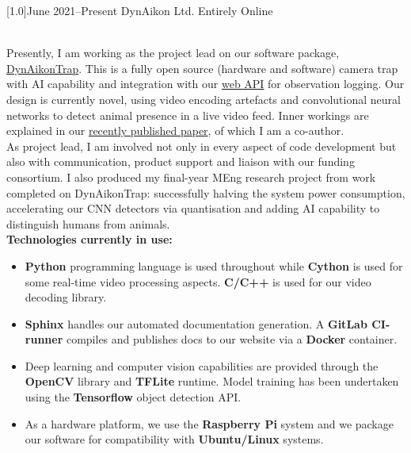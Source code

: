 \documentclass[]{cv-style}     %
\begin{document}
\begin{entrylist}
\entry
  {\scalebox{.8}[1.0]{June 2021--Present}}
  {DynAikon Ltd.}
  {Entirely Online}
  {\\
  Presently, I am working as the project lead on our software package, \href{https://dynaikon.com/trap-docs/user-docs.html}{DynAikonTrap}. This is a fully open source (hardware and software) camera trap with AI capability and integration with our \href{https://service.fastcat-cloud.org/api/spec}{web API} for observation logging. Our design is currently novel, using video encoding artefacts and convolutional neural networks to detect animal presence in a live video feed. Inner workings are explained in our \href{https://www.sciencedirect.com/science/article/pii/S1574954122001066}{recently published paper}, of which I am a co-author. 
  \\
  As project lead, I am involved not only in every aspect of code development but also with communication, product support and liaison with our funding consortium. I also produced my final-year MEng research project from work completed on DynAikonTrap: successfully halving the system power consumption, accelerating our CNN detectors via quantisation and adding AI capability to distinguish humans from animals. 
  \\
  \textbf{Technologies currently in use: }
  \begin{itemize}
    \item \textbf{Python} programming language is used throughout while \textbf{Cython} is used for some real-time video processing aspects. \textbf{C/C++} is used for our video decoding library. 
    \item \textbf{Sphinx} handles our automated documentation generation. A \textbf{GitLab CI-runner} compiles and publishes docs to our website via a \textbf{Docker} container. 
    \item Deep learning and computer vision capabilities are provided through the \textbf{OpenCV} library and \textbf{TFLite} runtime. Model training has been undertaken using the \textbf{Tensorflow} object detection API.
    \item As a hardware platform, we use the \textbf{Raspberry Pi} system and we package our software for compatibility with \textbf{Ubuntu/Linux} systems.
    

\end{itemize}}
\end{entrylist}
\end{document}
